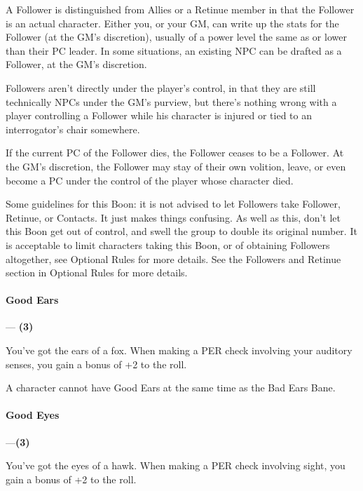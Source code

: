 \documentclass[oneside,11pt,english]{book}
\begin{document}
 

A Follower is distinguished from Allies or a Retinue member in that the Follower is an actual character. 
Either you, or your GM, can write up the stats for the Follower (at the GM's discretion), usually of a 
power level the same as or lower than their PC leader. In some situations, an existing NPC can be drafted 
as a Follower, at the GM's discretion. 

 

Followers aren't directly under the player's control, in that they are still technically NPCs under the GM's 
purview, but there's nothing wrong with a player controlling a Follower while his character is injured or 
tied to an interrogator's chair somewhere. 

 

If the current PC of the Follower dies, the Follower ceases to be a Follower. At the GM's discretion, the 
Follower may stay of their own volition, leave, or even become a PC under the control of the player 
whose character died. 

 

Some guidelines for this Boon: it is not advised to let Followers take Follower, Retinue, or Contacts. It 
just makes things confusing. As well as this, don't let this Boon get out of control, and swell the group to 
double its original number. It is acceptable to limit characters taking this Boon, or of obtaining Followers 
altogether, see Optional Rules for more details. See the Followers and Retinue section in Optional 
Rules for more details. 

 

\paragraph{\label{boon:Good Ears}Good Ears}---\quad\textbf{ (3) }\par
You've got the ears of a fox. When making a PER check involving your auditory senses, you gain a bonus 
of +2 to the roll. 


A character cannot have Good Ears at the same time as the Bad Ears Bane. 


\paragraph{\label{boon:Good Eyes}Good Eyes}---\quad\textbf{(3) }\par
You've got the eyes of a hawk. When making a PER check involving sight, you gain a bonus of +2 to the roll. 
\end{document}
